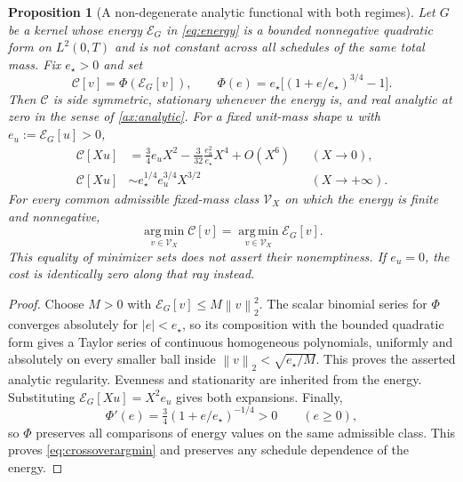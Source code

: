 \documentclass[11pt]{article}
\newcommand{\norm}[1]{\left\lVert #1\right\rVert}
\numberwithin{equation}{section}
\newtheorem{proposition}[theorem]{Proposition}
\theoremstyle{definition}
\theoremstyle{remark}
\theoremstyle{definition}
\newcommand{\argmin}{\operatorname*{arg\,min}}
\begin{document}
\begin{proposition}[A non-degenerate analytic functional with both regimes]
\label{prop:crossover}
Let $G$ be a kernel whose energy $\mathcal E_G$ in
\eqref{eq:energy} is a bounded nonnegative quadratic form on $L^2(0,T)$
and is not constant across all schedules of the same total mass. Fix
$e_\star>0$ and set
\begin{equation}\label{eq:energycrossover}
 \mathcal C[v]=\Phi(\mathcal E_G[v]),\qquad
 \Phi(e)=e_\star\bigl[(1+e/e_\star)^{3/4}-1\bigr].
\end{equation}
Then $\mathcal C$ is side symmetric, stationary whenever the energy is,
and real analytic at zero in the sense of \cref{ax:analytic}.
For a fixed unit-mass shape $u$ with $e_u:=\mathcal E_G[u]>0$,
\begin{align}\label{eq:crossoverregimes}
 \mathcal C[Xu]
 &=\tfrac34 e_uX^2-\tfrac3{32}\frac{e_u^2}{e_\star}X^4+O(X^6)
       &&(X\to0),\\
 \mathcal C[Xu]
 &\sim e_\star^{1/4}e_u^{3/4}X^{3/2}
       &&(X\to+\infty).\nonumber
\end{align}
For every common admissible fixed-mass class $\mathcal V_X$ on which the
energy is finite and nonnegative,
\begin{equation}\label{eq:crossoverargmin}
 \argmin_{v\in\mathcal V_X}\mathcal C[v]
 =\argmin_{v\in\mathcal V_X}\mathcal E_G[v].
\end{equation}
This equality of minimizer sets does not assert their nonemptiness.
If $e_u=0$, the cost is identically zero along that ray instead.
\end{proposition}
\begin{proof}
Choose $M>0$ with $\mathcal E_G[v]\le M\norm v_2^2$. The scalar binomial
series for $\Phi$ converges absolutely for $|e|<e_\star$, so its composition
with the bounded quadratic form gives a Taylor series of continuous
homogeneous polynomials, uniformly and absolutely on every smaller ball
inside $\norm v_2<\sqrt{e_\star/M}$. This proves the asserted analytic
regularity. Evenness and stationarity are inherited from the energy.
Substituting $\mathcal E_G[Xu]=X^2e_u$ gives both expansions.
Finally,
\[
 \Phi'(e)=\tfrac34(1+e/e_\star)^{-1/4}>0\qquad(e\ge0),
\]
so $\Phi$ preserves all comparisons of energy values on the same admissible
class. This proves \eqref{eq:crossoverargmin} and preserves any schedule
dependence of the energy.
\end{proof}
\end{document}
